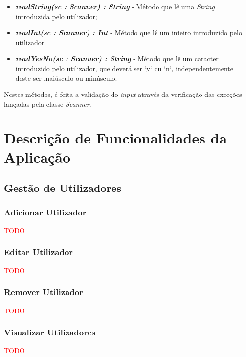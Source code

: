 \documentclass[a4paper,12pt]{scrreprt}
\begin{document}
    \begin{itemize}
        \item \textit{\textbf{readString(sc : Scanner) : String}} - Método que lê uma \textit{String} introduzida pelo utilizador;
        \item \textit{\textbf{readInt(sc : Scanner) : Int}} - Método que lê um inteiro introduzido pelo utilizador;
        \item \textit{\textbf{readYesNo(sc : Scanner) : String}} - Método que lê um caracter introduzido pelo utilizador, que deverá ser `y` ou `n`, independentemente deste ser maiúsculo ou minúsculo.
    \end{itemize}

    Nestes métodos, é feita a validação do \textit{input} através da verificação das exceções lançadas pela classe \textit{Scanner}.



\chapter{Descrição de Funcionalidades da Aplicação}

\section{Gestão de Utilizadores}
    \label{sec:gestao-utlizadores}
    \subsection{Adicionar Utilizador}
    \textcolor{red}{TODO}
    \subsection{Editar Utilizador}
    \textcolor{red}{TODO}
    \subsection{Remover Utilizador}
    \textcolor{red}{TODO}
    \subsection{Visualizar Utilizadores}
    \textcolor{red}{TODO}
\end{document}
